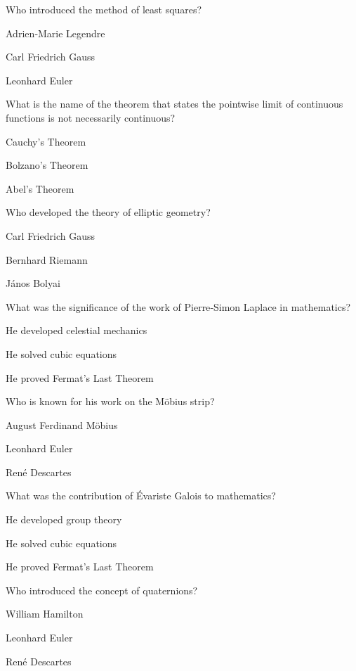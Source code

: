 \begin{enhancedmcq}{Who introduced the method of least squares?}
\item Adrien‑Marie Legendre
\item Carl Friedrich Gauss
\item Leonhard Euler

\end{enhancedmcq}
\begin{enhancedmcq}{What is the name of the theorem that states the pointwise limit of continuous functions is not necessarily continuous?}
\item Cauchy's Theorem
\item Bolzano's Theorem
\item Abel's Theorem

\end{enhancedmcq}
\begin{enhancedmcq}{Who developed the theory of elliptic geometry?}
\item Carl Friedrich Gauss
\item Bernhard Riemann
\item János Bolyai

\end{enhancedmcq}
\begin{enhancedmcq}{What was the significance of the work of Pierre‑Simon Laplace in mathematics?}
\item He developed celestial mechanics
\item He solved cubic equations
\item He proved Fermat's Last Theorem

\end{enhancedmcq}
\begin{enhancedmcq}{Who is known for his work on the Möbius strip?}
\item August Ferdinand Möbius
\item Leonhard Euler
\item René Descartes

\end{enhancedmcq}
\begin{enhancedmcq}{What was the contribution of Évariste Galois to mathematics?}
\item He developed group theory
\item He solved cubic equations
\item He proved Fermat's Last Theorem

\end{enhancedmcq}
\begin{enhancedmcq}{Who introduced the concept of quaternions?}
\item William Hamilton
\item Leonhard Euler
\item René Descartes

\end{enhancedmcq}
